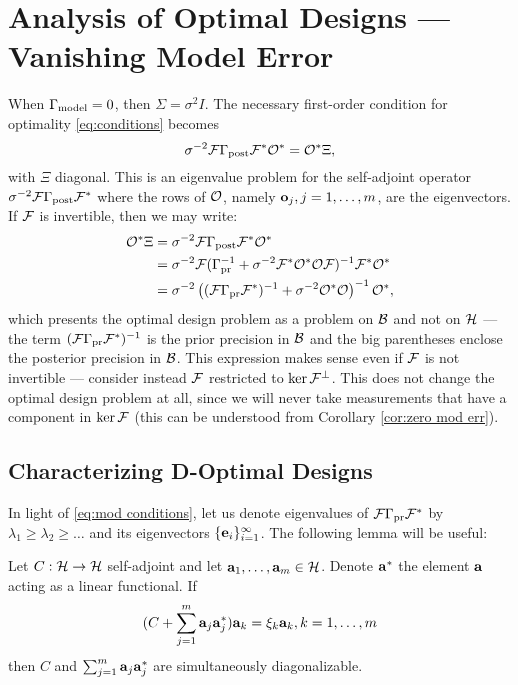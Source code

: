 \documentclass{amsart}
\numberwithin{equation}{section}
\begin{document}
\section{Analysis of Optimal Designs --- Vanishing Model Error}\label{section:vanishing}
When $\Gamma_{\textup{model}} = 0$, then $\Sigma= \sigma^2I$. The necessary
first-order condition for optimality \eqref{eq:conditions} becomes
\begin{equation}\label{eq:eigenproblem}
  \sigma^{-2}\mathcal{F} \Gamma_{\textup{post}} \mathcal{F}^* \mathcal{O}^* = \mathcal{O}^* \Xi, 
\end{equation}
with $\Xi$ diagonal. This is an eigenvalue problem for the
self-adjoint operator $\sigma^{-2}\mathcal{F} \Gamma_{\textup{post}} \mathcal{F}^*$ where the rows
of $\mathcal{O}$, namely $\mathbf{o}_j,j=1,\dots, m$, are the eigenvectors. If $\mathcal{F}$
is invertible, then we may write:
\begin{align}\label{eq:mod conditions}
  \begin{split}
  \mathcal{O}^* \Xi &= \sigma^{-2}\mathcal{F} \Gamma_{\textup{post}} \mathcal{F}^* \mathcal{O}^*  \\
  &= \sigma^{-2} \mathcal{F}( \Gamma_{\textup{pr}}^{-1} + \sigma^{-2}  \mathcal{F}^* \mathcal{O}^* \mathcal{O} \mathcal{F} )^{-1} \mathcal{F}^* \mathcal{O}^* \\
  &= \sigma^{-2} \left ( (\mathcal{F}\Gamma_{\textup{pr}}\mathcal{F}^*)^{-1} + \sigma^{-2}  \mathcal{O}^* \mathcal{O} \right )^{-1} \mathcal{O}^*,
  \end{split}
\end{align}  
which presents the optimal design problem as a problem on $\mathcal{B}$ and
not on $\mathcal{H}$ --- the term $(\mathcal{F} \Gamma_{\textup{pr}} \mathcal{F}^*)^{-1}$ is the prior
precision in $\mathcal{B}$ and the big parentheses enclose the posterior
precision in $\mathcal{B}$. This expression makes sense even if $\mathcal{F}$ is not
invertible --- consider instead $\mathcal{F}$ restricted to $\ker
\mathcal{F}^{\perp}$. This does not change the optimal design problem at all,
since we will never take measurements that have a component in $\ker
\mathcal{F}$ (this can be understood from Corollary \ref{cor:zero mod err}).

\subsection{Characterizing D-Optimal Designs}\label{subsub:characterization}
In light of \eqref{eq:mod conditions}, let us denote eigenvalues of
$\mathcal{F} \Gamma_{\textup{pr}} \mathcal{F}^*$ by $\lambda_1 \geq \lambda_2 \geq \dots$ and its
eigenvectors $\{\mathbf{e}_i\}_{i=1}^{\infty}$. The following lemma will be useful:

\begin{lemma}
  Let $C:\mathcal{H} \to \mathcal{H}$ self-adjoint and let $\mathbf{a}_1,\dots,\mathbf{a}_m \in
  \mathcal{H}$. Denote $\mathbf{a}^*$ the element $\mathbf{a}$ acting as a linear
  functional. If
  \begin{equation*}
   (C + \sum_{j=1}^m \mathbf{a}_j\mathbf{a}_j^*) \mathbf{a}_k = \xi_k \mathbf{a}_k, k = 1,\dots,m
  \end{equation*}
  then $C$ and $\sum_{j=1}^m \mathbf{a}_j \mathbf{a}_j^*$ are simultaneously
  diagonalizable.
\end{lemma}
\end{document}
